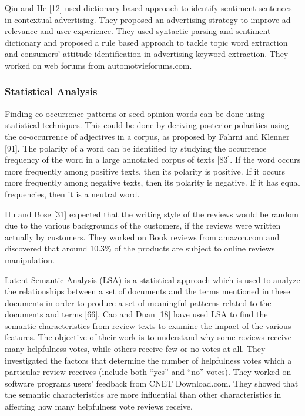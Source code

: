 Qiu and He [12] used dictionary-based approach to identify sentiment sentences in contextual advertising. They proposed an advertising strategy to improve ad relevance and user experience. They used syntactic parsing and sentiment dictionary and proposed a rule based approach to tackle topic word extraction and consumers’ attitude identification in advertising keyword extraction. They worked on web forums from automotvieforums.com. 



\subsubsection{Statistical Analysis}
Finding co-occurrence patterns or seed opinion words can be done using statistical techniques. This could be done by deriving posterior polarities using the co-occurrence of adjectives in a corpus, as proposed by Fahrni and Klenner [91].
The polarity of a word can be identified by studying the occurrence frequency of the word in a large annotated corpus of texts [83]. If the word occurs more frequently among positive texts, then its polarity is positive. If it occurs more frequently among negative texts, then its polarity is negative. If it has equal frequencies, then it is a neutral word.

Hu and Bose [31] expected that the writing style of the reviews would be random due to the various backgrounds of the customers, if the reviews were written actually by customers. They worked on Book reviews from amazon.com and discovered that around 10.3\% of the products are subject to online reviews manipulation.

Latent Semantic Analysis (LSA) is a statistical approach which is used to analyze the relationships between a set of documents and the terms mentioned in these documents in order to produce a set of meaningful patterns related to the documents and terms [66]. Cao and Duan [18] have used LSA to find the semantic characteristics from review texts to examine the impact of the various features. The objective of their work is to understand why some reviews receive many helpfulness votes, while others receive few or no votes at all. They investigated the factors that determine the number of helpfulness votes which a particular review receives (include both “yes” and “no” votes). They worked on software programs users’ feedback from CNET Download.com. They showed that the semantic characteristics are more influential than other characteristics in affecting how many helpfulness vote reviews receive.


